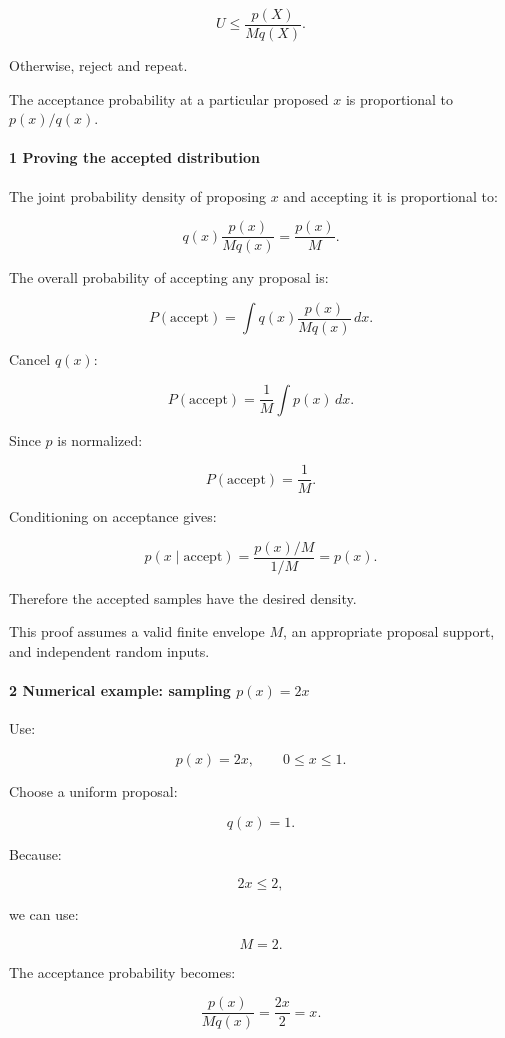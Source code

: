 \[
 \boxed{ U\le\frac{p(X)}{Mq(X)} }.
\]

Otherwise, reject and repeat.

The acceptance probability at a particular proposed \(x\) is proportional to \(p(x)/q(x)\).

\paragraph{1 Proving the accepted distribution}\label{proving-the-accepted-distribution}

The joint probability density of proposing \(x\) and accepting it is proportional to:

\[
 q(x)\frac{p(x)}{Mq(x)} = \frac{p(x)}M.
\]

The overall probability of accepting any proposal is:

\[
 P(\text{accept}) = \int q(x)\frac{p(x)}{Mq(x)}\,dx.
\]

Cancel \(q(x)\):

\[
 P(\text{accept}) = \frac1M\int p(x)\,dx.
\]

Since \(p\) is normalized:

\[
 \boxed{ P(\text{accept})=\frac1M }.
\]

Conditioning on acceptance gives:

\[
 p(x\mid\text{accept}) = \frac{p(x)/M}{1/M} =p(x).
\]

Therefore the accepted samples have the desired density.

This proof assumes a valid finite envelope \(M\), an appropriate proposal support, and independent random inputs.

\paragraph{\texorpdfstring{2 Numerical example: sampling \(p(x)=2x\)}{2 Numerical example: sampling p(x)=2x}}\label{numerical-example-sampling-px2x}

Use:

\[
 p(x)=2x,\qquad0\le x\le1.
\]

Choose a uniform proposal:

\[
 q(x)=1.
\]

Because:

\[
 2x\le2,
\]

we can use:

\[
 M=2.
\]

The acceptance probability becomes:

\[
 \frac{p(x)}{Mq(x)} = \frac{2x}{2} =x.
\]

